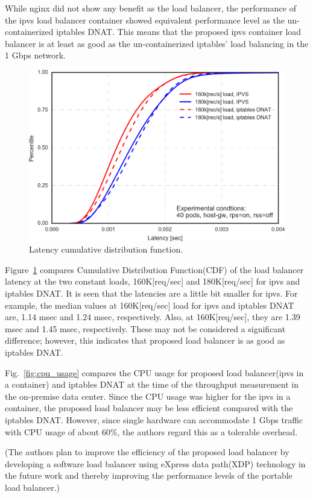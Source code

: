 While nginx did not show any benefit as the load balancer, the performance of the ipvs load balancer container showed equivalent performance level as the un-containerized iptables DNAT.
This means that the proposed ipvs container load balancer is at least as good as the un-containerized iptables' load balancing in the 1 Gbps network.

\begin{figure}[h]
  \centering
  \includegraphics[width=0.8\columnwidth]{Figs/latency_cdf_rps_40pods}
  \caption{Latency cumulative distribution function.}
  \label{fig:latency_cdf_rps_40pods}
\end{figure}

Figure~\ref{fig:latency_cdf_rps_40pods} compares Cumulative Distribution Function(CDF) of the load balancer latency at the two constant loads, 160K[req/sec] and 180K[req/sec] for ipvs and iptables DNAT.
It is seen that the latencies are a little bit smaller for ipvs.
For example, the median values at 160K[req/sec] load for ipvs and iptables DNAT are, 1.14 msec and 1.24 msec, respectively.
Also, at 160K[req/sec], they are 1.39 msec and 1.45 msec, respectively.
These may not be considered a significant difference; however, this indicates that proposed load balancer is as good as iptables DNAT.

Fig.~\ref{fig:cpu_usage} compares the CPU usage for proposed load balancer(ipvs in a container) and iptables DNAT at the time of the throughput measurement in the on-premise data center.
Since the CPU usage was higher for the ipvs in a container, the proposed load balancer may be less efficient compared with the iptables DNAT.
However, since single hardware can accommodate 1 Gbps traffic with CPU usage of about 60\%, the authors regard this as a tolerable overhead.

(The authors plan to improve the efficiency of the proposed load balancer by developing a software load balancer using eXpress data path(XDP) technology\cite{hoiland2018express} in the future work and thereby improving the performance levels of the portable load balancer.)

